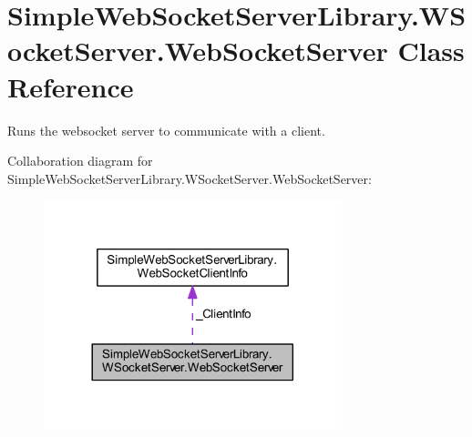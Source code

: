 \hypertarget{class_simple_web_socket_server_library_1_1_w_socket_server_1_1_web_socket_server}{}\section{Simple\+Web\+Socket\+Server\+Library.\+W\+Socket\+Server.\+Web\+Socket\+Server Class Reference}
\label{class_simple_web_socket_server_library_1_1_w_socket_server_1_1_web_socket_server}


Runs the websocket server to communicate with a client.  




Collaboration diagram for Simple\+Web\+Socket\+Server\+Library.\+W\+Socket\+Server.\+Web\+Socket\+Server\+:
\nopagebreak
\begin{figure}[H]
\begin{center}
\leavevmode
\includegraphics[width=245pt]{class_simple_web_socket_server_library_1_1_w_socket_server_1_1_web_socket_server__coll__graph}
\end{center}
\end{figure}
